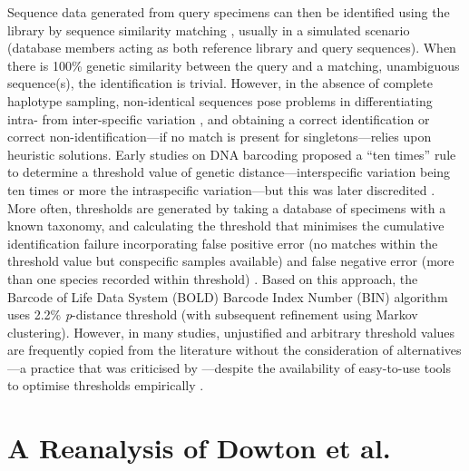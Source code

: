 \documentclass[12pt]{article}
\begin{document}
Sequence data generated from query specimens can then be identified using the library by sequence similarity matching \citep{Meier2006}, usually in a simulated scenario (database members acting as both reference library and query sequences). When there is 100\% genetic similarity between the query and a matching, unambiguous sequence(s), the identification is trivial. However, in the absence of complete haplotype sampling, non-identical sequences pose problems in differentiating intra- from inter-specific variation \citep{Virgilio2012}, and obtaining a correct identification or correct non-identification---if no match is present for singletons---relies upon heuristic solutions. Early studies on DNA barcoding \citep[e.g.][]{Hebert2004} proposed a ``ten times'' rule to determine a threshold value of genetic distance---interspecific variation being ten times or more the intraspecific variation---but this was later discredited \citep{Hickerson2006}. More often, thresholds are generated by taking a database of specimens with a known taxonomy, and calculating the threshold that minimises the cumulative identification failure incorporating false positive error (no matches within the threshold value but conspecific samples available) and false negative error (more than one species recorded within threshold) \citep{Meyer2005}. Based on this approach, the Barcode of Life Data System (BOLD) Barcode Index Number (BIN) algorithm \citep{Ratnasingham2013} uses 2.2\% \emph{p}-distance threshold (with subsequent refinement using Markov clustering). However, in many studies, unjustified and arbitrary threshold values are frequently copied from the literature without the consideration of alternatives---a practice that was criticised by \citet{Collins2013}---despite the availability of easy-to-use tools to optimise thresholds empirically \citep{Brown2012,Puillandre2012b,Virgilio2012,Sonet2013}.

\section*{A Reanalysis of Dowton et al.}
\end{document}

